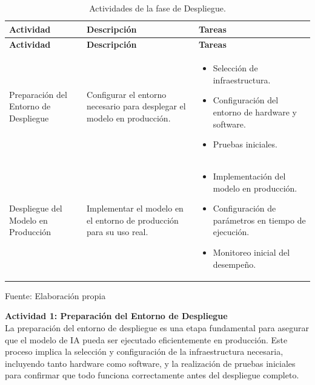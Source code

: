 \begin{longtable}{|>{\raggedright\arraybackslash}p{4cm}|>{\raggedright\arraybackslash}p{5cm}|>{\raggedright\arraybackslash}p{6cm}|}
    \caption{Actividades de la fase de Despliegue.}
    \label{tabla:actividades}\\
    \hline
    \textbf{Actividad} & \textbf{Descripción} & \textbf{Tareas} \\
    \hline
    \endfirsthead

    \hline
    \textbf{Actividad} & \textbf{Descripción} & \textbf{Tareas} \\
    \hline
    \endhead

    \hline
    \endfoot

    \hline
    \endlastfoot

    Preparación del Entorno de Despliegue & Configurar el entorno necesario para desplegar el modelo en producción. & 
    \begin{itemize}
        \item Selección de infraestructura.
        \item Configuración del entorno de hardware y software.
        \item Pruebas iniciales.
    \end{itemize} \\
    \hline
    Despliegue del Modelo en Producción & Implementar el modelo en el entorno de producción para su uso real. & 
    \begin{itemize}
        \item Implementación del modelo en producción.
        \item Configuración de parámetros en tiempo de ejecución.
        \item Monitoreo inicial del desempeño.
    \end{itemize} \\
    \hline
\end{longtable}
\begin{flushleft}	%
	\small Fuente: Elaboración propia
\end{flushleft}

\textbf{Actividad 1: Preparación del Entorno de Despliegue}
\\
La preparación del entorno de despliegue es una etapa fundamental para asegurar que el modelo de IA pueda ser ejecutado eficientemente en producción. Este proceso implica la selección y configuración de la infraestructura necesaria, incluyendo tanto hardware como software, y la realización de pruebas iniciales para confirmar que todo funciona correctamente antes del despliegue completo.

